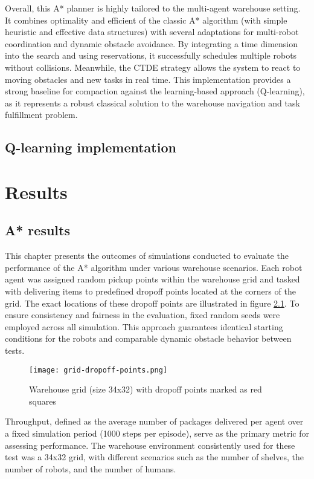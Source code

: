 \documentclass{kththesis}
\begin{document}
Overall, this A* planner is highly tailored to the multi-agent warehouse setting. It combines optimality and efficient of the classic A* algorithm (with simple heuristic and effective data structures) with several adaptations for multi-robot coordination and dynamic obstacle avoidance. By integrating a time dimension into the search and using reservations, it successfully schedules multiple robots without collisions. Meanwhile, the CTDE strategy allows the system to react to moving obstacles and new tasks in real time. This implementation provides a strong baseline for compaction against the learning-based approach (Q-learning), as it represents a robust classical solution to the warehouse navigation and task fulfillment problem. 

\section{Q-learning implementation}


\chapter{Results}
\section{A* results}
This chapter presents the outcomes of simulations conducted to evaluate the performance of the A* algorithm under various warehouse scenarios. Each robot agent was assigned random pickup points within the warehouse grid and tasked with delivering items to predefined dropoff points located at the corners of the grid. The exact locations of these dropoff points are illustrated in figure \ref{grid-with-dropoff-points}. To ensure consistency and fairness in the evaluation, fixed random seeds were employed across all simulation. This approach guarantees identical starting conditions for the robots and comparable dynamic obstacle behavior between tests. 

\begin{figure}
    \centering
    \texttt{[image: grid-dropoff-points.png]}
    \caption{Warehouse grid (size 34x32) with dropoff points marked as red squares}
    \label{grid-with-dropoff-points}
\end{figure}

Throughput, defined as the average number of packages delivered per agent over a fixed simulation period (1000 steps per episode), serve as the primary metric for assessing performance. The warehouse environment consistently used for these test was a 34x32 grid, with different scenarios such as the number of shelves, the number of robots, and the number of humans.
\end{document}
